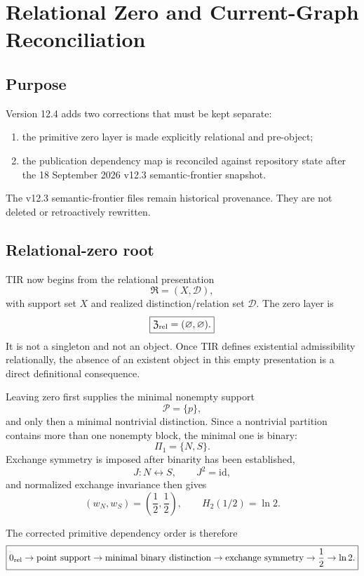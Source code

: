 \chapter{Relational Zero and Current-Graph Reconciliation}
\label{app:v12_relational_zero_graph_reconciliation}

\section{Purpose}

Version 12.4 adds two corrections that must be kept separate:

\begin{enumerate}
\item the primitive zero layer is made explicitly relational and pre-object;
\item the publication dependency map is reconciled against repository state after the
18 September 2026 v12.3 semantic-frontier snapshot.
\end{enumerate}

The v12.3 semantic-frontier files remain historical provenance. They are not deleted or
retroactively rewritten.

\section{Relational-zero root}

TIR now begins from the relational presentation
\[
\mathfrak R=(X,\mathcal D),
\]
with support set $X$ and realized distinction/relation set $\mathcal D$. The zero layer is
\[
\boxed{
\mathfrak Z_{\rm rel}=(\varnothing,\varnothing).
}
\]
It is not a singleton and not an object. Once TIR defines existential admissibility
relationally, the absence of an existent object in this empty presentation is a direct
definitional consequence.

Leaving zero first supplies the minimal nonempty support
\[
\boxed{\mathcal P=\{p\}},
\]
and only then a minimal nontrivial distinction. Since a nontrivial partition contains
more than one nonempty block, the minimal one is binary:
\[
\boxed{\Pi_1=\{N,S\}}.
\]
Exchange symmetry is imposed after binarity has been established,
\[
J:N\leftrightarrow S,\qquad J^2=\mathrm{id},
\]
and normalized exchange invariance then gives
\[
\boxed{(w_N,w_S)=\left(\frac12,\frac12\right)},
\qquad
\boxed{H_2(1/2)=\ln2}.
\]

The corrected primitive dependency order is therefore
\[
\boxed{
0_{\rm rel}
\to
\text{point support}
\to
\text{minimal binary distinction}
\to
\text{exchange symmetry}
\to
\frac12
\to
\ln2.
}
\]

